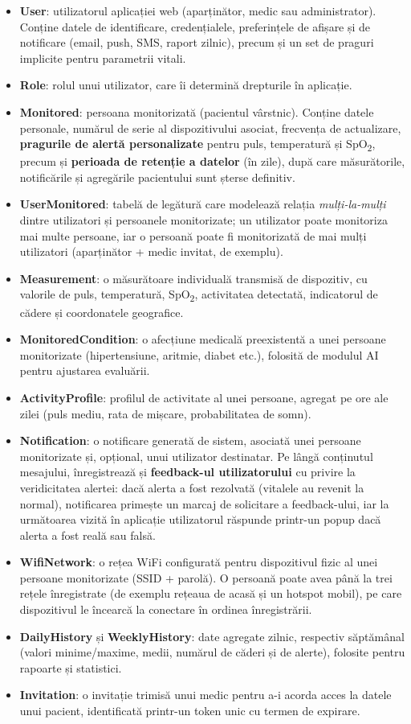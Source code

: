 \documentclass[12pt,a4paper]{article}
\newcommand{\spo}{SpO\textsubscript{2}}
\begin{document}
\begin{itemize}[leftmargin=1.5em]
\item \textbf{User}: utilizatorul aplicației web (aparținător, medic sau administrator). Conține datele de identificare, credențialele, preferințele de afișare și de notificare (email, push, SMS, raport zilnic), precum și un set de praguri implicite pentru parametrii vitali.
\item \textbf{Role}: rolul unui utilizator, care îi determină drepturile în aplicație.
\item \textbf{Monitored}: persoana monitorizată (pacientul vârstnic). Conține datele personale, numărul de serie al dispozitivului asociat, frecvența de actualizare, \textbf{pragurile de alertă personalizate} pentru puls, temperatură și \spo, precum și \textbf{perioada de retenție a datelor} (în zile), după care măsurătorile, notificările și agregările pacientului sunt șterse definitiv.
\item \textbf{UserMonitored}: tabelă de legătură care modelează relația \textit{mulți-la-mulți} dintre utilizatori și persoanele monitorizate; un utilizator poate monitoriza mai multe persoane, iar o persoană poate fi monitorizată de mai mulți utilizatori (aparținător + medic invitat, de exemplu).
\item \textbf{Measurement}: o măsurătoare individuală transmisă de dispozitiv, cu valorile de puls, temperatură, \spo, activitatea detectată, indicatorul de cădere și coordonatele geografice.
\item \textbf{MonitoredCondition}: o afecțiune medicală preexistentă a unei persoane monitorizate (hipertensiune, aritmie, diabet etc.), folosită de modulul AI pentru ajustarea evaluării.
\item \textbf{ActivityProfile}: profilul de activitate al unei persoane, agregat pe ore ale zilei (puls mediu, rata de mișcare, probabilitatea de somn).
\item \textbf{Notification}: o notificare generată de sistem, asociată unei persoane monitorizate și, opțional, unui utilizator destinatar. Pe lângă conținutul mesajului, înregistrează și \textbf{feedback-ul utilizatorului} cu privire la veridicitatea alertei: dacă alerta a fost rezolvată (vitalele au revenit la normal), notificarea primește un marcaj de solicitare a feedback-ului, iar la următoarea vizită în aplicație utilizatorul răspunde printr-un popup dacă alerta a fost reală sau falsă.
\item \textbf{WifiNetwork}: o rețea WiFi configurată pentru dispozitivul fizic al unei persoane monitorizate (SSID + parolă). O persoană poate avea până la trei rețele înregistrate (de exemplu rețeaua de acasă și un hotspot mobil), pe care dispozitivul le încearcă la conectare în ordinea înregistrării.
\item \textbf{DailyHistory} și \textbf{WeeklyHistory}: date agregate zilnic, respectiv săptămânal (valori minime/maxime, medii, numărul de căderi și de alerte), folosite pentru rapoarte și statistici.
\item \textbf{Invitation}: o invitație trimisă unui medic pentru a-i acorda acces la datele unui pacient, identificată printr-un token unic cu termen de expirare.
\end{itemize}
\end{document}
